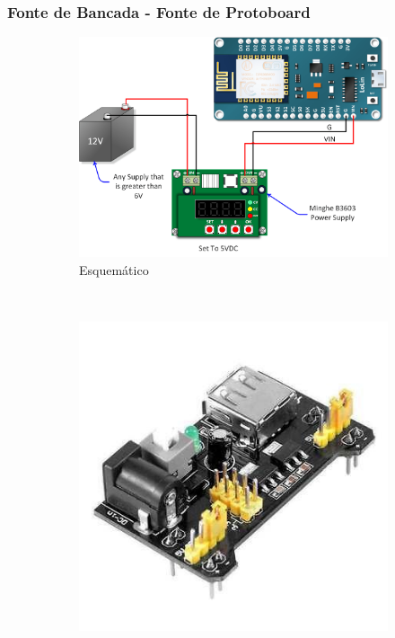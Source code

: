 \documentclass{beamer}
\begin{document}
\begin{frame}
\frametitle{Fonte de Bancada - Fonte de Protoboard}
\begin{minipage}{\textwidth}
	\begin{figure}
		\centering
		\begin{subfigure}[b]{0.4\textwidth}
			\includegraphics[width=\textwidth]{NodeMCU-Powered-by-B3603.png}
			\caption{Esquemático}
			\label{fig:arudinofdfd_uno}
		\end{subfigure}
		~ %
		\begin{subfigure}[b]{0.25\textwidth}
			\includegraphics[width=\textwidth]{fonte_protoboard.jpg}

\end{subfigure}
\end{figure}
\end{minipage}
\end{frame}
\end{document}
